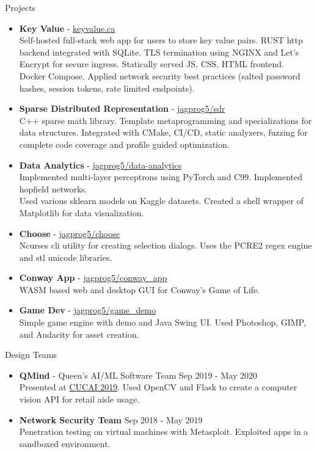 \documentclass{resume} %
\begin{document}
\begin{rSection}{Projects}
    \begin{itemize}
        \item {\bf Key Value} - \href{http://www.keyvalue.ca/}{keyvalue.ca}\\
        Self-hosted full-stack web app for users to store key value pairs. RUST http backend integrated with SQLite. TLS termination using NGINX and Let's Encrypt for secure ingress.
        Statically served JS, CSS, HTML frontend. Docker Compose. Applied network security best practices (salted password hashes, session tokens, rate limited endpoints).
        \item {\bf Sparse Distributed Representation} - \href{https://github.com/jagprog5/SDR/}{jagprog5/sdr}\\
        C++ sparse math library. Template metaprogramming and specializations for data structures. Integrated with CMake, CI/CD, static analyzers, fuzzing for complete code coverage and profile guided optimization.
        \item {\bf Data Analytics} - \href{https://github.com/jagprog5/resume/blob/main/data-analytics-projects.md}{jagprog5/data-analytics}\\
        Implemented multi-layer perceptrons using PyTorch and C99. Implemented hopfield networks.\\
        Used various sklearn models on Kaggle datasets. Created a shell wrapper of Matplotlib for data visualization. 
        \item {\bf Choose} - \href{https://github.com/jagprog5/choose/}{jagprog5/choose}\\
        Ncurses cli utility for creating selection dialogs. Uses the PCRE2 regex engine and stl unicode libraries.
        \item {\bf Conway App} - \href{https://github.com/jagprog5/conway_app/}{jagprog5/conway\_app}\\
        WASM based web and desktop GUI for Conway's Game of Life.
        \item {\bf Game Dev} - \href{https://github.com/jagprog5/GameDemo}{jagprog5/game\_demo}\\
        Simple game engine with demo and Java Swing UI. Used Photoshop, GIMP, and Audacity for asset creation.
    \end{itemize}
\end{rSection}

\begin{rSection}{Design Teams}
    \begin{itemize}
        \item {\bf QMind} - Queen's AI/ML Software Team \hfill {Sep 2019 - May 2020}\\
        Presented at \href{https://medium.com/qmind-ai/cucai2019-c9d5f848f5c}{CUCAI 2019}. Used OpenCV and Flask to create a computer vision API for retail aisle usage.
        \item {\bf Network Security Team} \hfill {Sep 2018 - May 2019}\\
        Penetration testing on virtual machines with Metasploit. Exploited apps in a sandboxed environment.
\end{itemize}
\end{rSection}
\end{document}
